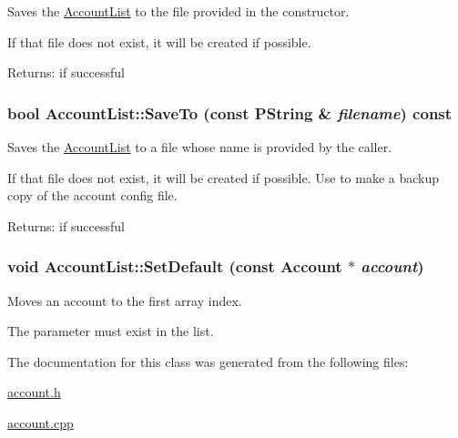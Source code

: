 Saves the \hyperlink{classAccountList}{AccountList} to the file provided in the constructor. 

If that file does not exist, it will be created if possible. \begin{Desc}
\item[Returns:]if successful \end{Desc}
\hypertarget{classAccountList_1a289fad4cfa2e10362a3de84e2bd091}{
\subsubsection[{SaveTo}]{\setlength{\rightskip}{0pt plus 5cm}bool AccountList::SaveTo (const PString \& {\em filename}) const}}
\label{classAccountList_1a289fad4cfa2e10362a3de84e2bd091}


Saves the \hyperlink{classAccountList}{AccountList} to a file whose name is provided by the caller. 

If that file does not exist, it will be created if possible. Use to make a backup copy of the account config file. \begin{Desc}
\item[Returns:]if successful \end{Desc}
\hypertarget{classAccountList_e94a2c11a78e44ac3724018d4142cbd7}{
\subsubsection[{SetDefault}]{\setlength{\rightskip}{0pt plus 5cm}void AccountList::SetDefault (const {\bf Account} $\ast$ {\em account})}}
\label{classAccountList_e94a2c11a78e44ac3724018d4142cbd7}


Moves an account to the first array index. 

The parameter must exist in the list. 

The documentation for this class was generated from the following files:\begin{CompactItemize}
\item 
\hyperlink{account_8h}{account.h}\item 
\hyperlink{account_8cpp}{account.cpp}\end{CompactItemize}
